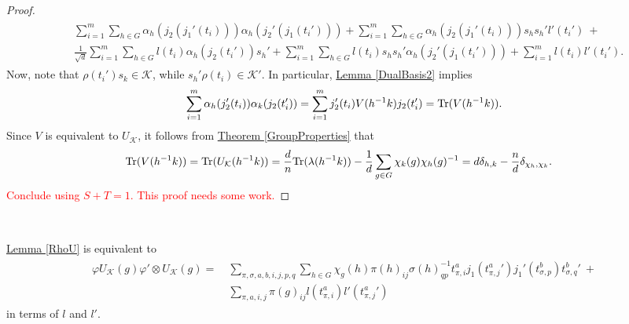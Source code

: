 \begin{proof}
\begin{align*}
\begin{split}
&\sum_{i = 1}^m\sum_{h\in G}\alpha_h(j_2(j_1'(t_i)))\alpha_h(j_2'(j_1(t_i'))) + \sum_{i = 1}^m\sum_{h\in G}\alpha_h(j_2(j_1'(t_i)))s_hs_h'l'(t_i')\ +\\
&\frac{1}{\sqrt{d}}\sum_{i = 1}^m\sum_{h\in G}l(t_i)\alpha_h(j_2(t_i'))s_h' + \sum_{i = 1}^m\sum_{h\in G}l(t_i)s_hs_h'\alpha_h(j_2'(j_1(t_i'))) + \sum_{i = 1}^m l(t_i)l'(t_i').
\end{split}
\end{align*}
\noindent Now, note that $\rho(t_i')s_k \in \mathcal{K}$, while $s_h'\rho(t_i) \in \mathcal{K}'$. In particular, \hyperref[DualBasis2]{Lemma \ref*{DualBasis2}} implies
\begin{align*}
\sum_{i = 1}^m \alpha_h(j_2'(t_i))\alpha_k(j_2(t_i')) = \sum_{i = 1}^m j_2'(t_i)V(h^{-1}k)j_2(t_i') = \textup{Tr}(V(h^{-1}k)).
\end{align*}
\noindent Since $V$ is equivalent to $U_\mathcal{K}$, it follows from \hyperref[GroupProperties]{Theorem \ref*{GroupProperties}} that
\begin{align*}
\textup{Tr}(V(h^{-1}k)) &= \textup{Tr}(U_\mathcal{K}(h^{-1}k)) = \frac{d}{n}\textup{Tr}(\lambda(h^{-1}k)) - \frac{1}{d}\sum_{g\in G}\chi_k(g)\chi_h(g)^{-1} = d\delta_{h,k} - \frac{n}{d}\delta_{\chi_h,\chi_k}.
\end{align*}
\noindent\textcolor{red}{Conclude using $S + T = 1$. This proof needs some work.} %
\end{proof}\\

\noindent\begin{lemma} \hyperref[RhoU]{Lemma \ref*{RhoU}} is equivalent to
\begin{align}
\begin{split}
\varphi U_\mathcal{K}(g) \varphi' \otimes U_\mathcal{K}(g) =\ &\sum_{\pi,\sigma,a,b,i,j,p,q}\sum_{h \in G}\chi_g(h)\pi(h)_{ij}\sigma(h)_{qp}^{-1}t_{\pi,i}^a j_1({t_{\pi,j}^a}')j_1'(t_{\sigma,p}^b){t_{\sigma,q}^b}'\ +\\
&\sum_{\pi,a,i,j}\pi(g)_{ij}l(t_{\pi,i}^a)l'({t_{\pi,j}^a}')
\end{split}
\end{align}
\noindent in terms of $l$ and $l'$.\\
\end{lemma}

